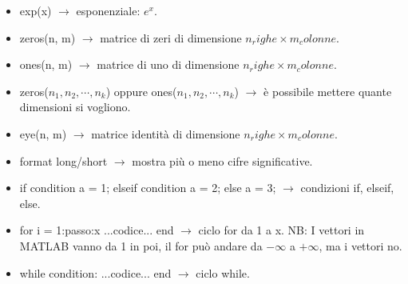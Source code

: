 \begin{itemize}
    \item exp(x) $\rightarrow$ esponenziale: $e^x$.
    \item zeros(n, m) $\rightarrow$ matrice di zeri di dimensione $n_righe \times m_colonne$.
    \item ones(n, m) $\rightarrow$ matrice di uno di dimensione $n_righe \times m_colonne$.
    \item zeros($n_1,n_2, \cdots, n_k$) oppure ones($n_1,n_2, \cdots, n_k$) $\rightarrow$ è possibile mettere quante dimensioni si vogliono.
    \item eye(n, m) $\rightarrow$ matrice identità di dimensione $n_righe \times m_colonne$.
    \item format long/short $\rightarrow$ mostra più o meno cifre significative.
    \newpage
    \item if condition
        \newline
        a = 1;
        \newline
        elseif condition
        \newline
        a = 2;
        \newline
        else
        \newline
        a = 3; $\rightarrow$ condizioni if, elseif, else.
    \item for i = 1:passo:x
        \newline
        ...codice...
        \newline
        end $\rightarrow$ ciclo for da 1 a x. NB: I vettori in MATLAB vanno da 1 in poi, il for può andare da $-\infty$ a $+\infty$, ma i vettori no.   
    \item while condition:
        \newline
        ...codice...
        \newline
        end $\rightarrow$ ciclo while.
\end{itemize} 